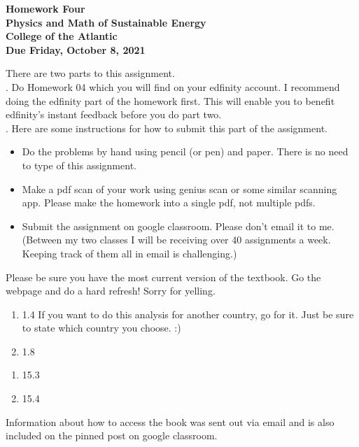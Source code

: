 \documentclass[12pt]{article}
\begin{document}
\pagestyle{empty}
 
\begin{center}
{\LARGE {\bf Homework Four}}\\
\bigskip
{\Large {\bf Physics and Math of Sustainable Energy}}\\
\bigskip
{\Large {\bf College of the Atlantic}}\\
\bigskip
{ {\bf Due Friday, October 8, 2021}}\\ 
\end{center}
\medskip


\noindent There are two parts to this assignment.\\

.  Do Homework 04 which you will find
on your edfinity account.  I recommend doing the edfinity part of the
homework first.  This will enable you to benefit edfinity's instant
feedback before you do part two.\\


.  Here are some
instructions for how to submit this part of the assignment.
\begin{itemize}
\item Do the problems by hand using pencil (or pen) and paper.
  There is no need to type of this assignment.
\item Make a pdf scan of your work using genius scan or some
  similar scanning app.  Please make the homework into a single
  pdf, not multiple pdfs.
\item Submit the assignment on google classroom.  Please don't
  email it to me.  (Between my two classes I will be receiving
  over 40 assignments a week.  Keeping track of them all in email
  is challenging.)\\
\end{itemize}


  Please be sure you have the most
current version of the textbook.  Go the webpage and do a hard
refresh!  Sorry for yelling.\\ 

\begin{enumerate}
\setlength{\itemsep}{-1mm}
\item 1.4 If you want to do this analysis for another country, go for
  it.  Just be sure to state which country you choose.  :)
\item 1.8\\
\end{enumerate}

\begin{enumerate}
\setlength{\itemsep}{-1mm}
\item 15.3
\item 15.4\\
\end{enumerate}

\noindent Information about how to access the book was sent out
via email and is also included on the pinned post on google
classroom. 
\end{document}
